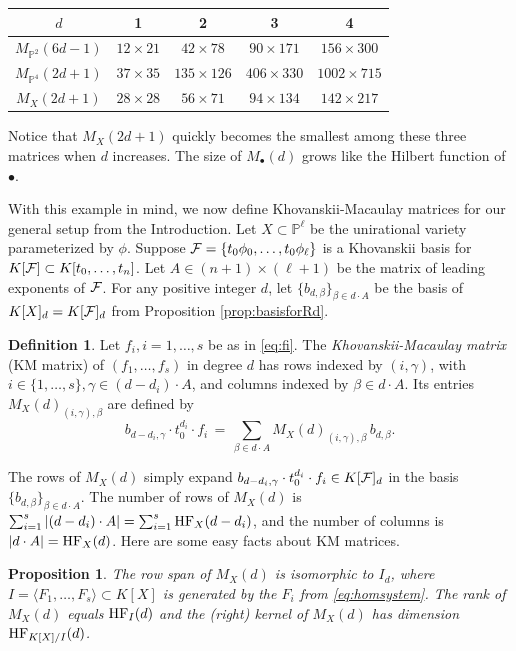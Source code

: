 \documentclass[12pt]{article}
\newtheorem{prop}[thm]{Proposition}
\theoremstyle{definition}
\newenvironment{example}
  {\pushQED{\qed}\renewcommand{\qedsymbol}{$\diamond$}\examplex}
  {\popQED\endexamplex}
\newtheorem{defn}[thm]{Definition}
\theoremstyle{remark}
\begin{document}
\begin{example}
\begin{center}
\begin{tabular}{c|cccc}
$d$                   & 1              & 2                & 3                & 4                \\ \hline
$M_{\mathbb{P}^2}(6d-1)$ & $12 \times 21$ & $42 \times 78$   & $90 \times 171$  & $156 \times 300$ \\
$M_{\mathbb{P}^4}(2d+1)$ & $37 \times 35$ & $135 \times 126$ & $406 \times 330$ & $1002\times 715$ \\
$M_{X}(2d+1)$            & $28 \times 28$ & $56 \times 71$   & $94 \times 134$  & $142 \times 217$
\end{tabular}
\end{center}

Notice that $M_X(2d+1)$ quickly becomes the smallest among these three matrices when $d$ increases. The size of $M_\bullet(d)$ grows like the Hilbert function of $\bullet$. 
\end{example}

With this example in mind, we now define Khovanskii-Macaulay matrices for our general setup from the Introduction. Let $X \subset \mathbb{P}^\ell$ be the unirational variety parameterized by $\phi$. Suppose ${\cal F} = \{t_0 \phi_0, \ldots, t_0 \phi_\ell \}$ is a Khovanskii basis for $K[{\cal F}] \subset K[t_0, \ldots, t_n]$. Let $A \in (n+1) \times (\ell + 1)$ be the matrix of leading exponents of ${\cal F}$. For any positive integer $d$, let $\{b_{d,\beta}\}_{\beta \in d \cdot A}$ be the basis of $K[X]_d = K[{\cal F}]_d$ from Proposition \ref{prop:basisforRd}.

\begin{defn}
Let $f_i, i = 1, \ldots, s$ be as in \eqref{eq:fi}. The \emph{Khovanskii-Macaulay matrix} (KM matrix) of $(f_1, \ldots, f_s)$ in degree $d$ has rows indexed by $(i,\gamma)$, with $i \in \{1, \ldots, s\}, \gamma \in (d-d_i) \cdot A$, and columns indexed by $\beta \in d \cdot A$. Its entries $M_X(d)_{(i,\gamma),\beta}$ are defined by  
    \begin{equation} \label{eq:expandmac}
    b_{d-d_i,\gamma} \cdot t_0^{d_i} \cdot  f_i \, = \, \sum_{\beta \in d \cdot A} M_X(d)_{(i,\gamma),\beta} \,  b_{d,\beta}. \end{equation}
\end{defn}
The rows of $M_X(d)$ simply expand $b_{d-d_i,\gamma} \cdot  t_0^{d_i} \cdot  f_i \in K[{\cal F}]_d$ in the basis $\{b_{d,\beta}\}_{\beta \in d \cdot A}$. The number of rows of $M_X(d)$ is $\sum_{i = 1}^s |(d-d_i) \cdot A| = \sum_{i=1}^s {\rm HF}_X(d-d_i)$, and the number of columns is $|d \cdot A| = {\rm HF}_X(d)$.
Here are some easy facts about KM matrices. 
\begin{prop} \label{prop:macprop}
    The row span of $M_X(d)$ is isomorphic to $I_d$, where $I = \langle F_1, \ldots, F_s \rangle \subset K[X]$ is generated by the $F_i$ from \eqref{eq:homsystem}. The rank of $M_X(d)$ equals ${\rm HF}_{I}(d)$ and the (right) kernel of $M_X(d)$ has dimension ${\rm HF}_{K[X]/I}(d)$. 
\end{prop}
\end{document}
